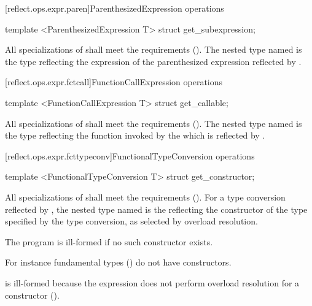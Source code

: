 [reflect.ops.expr.paren]{ParenthesizedExpression operations}
\begin{std.txt}\color{addclr}
\begin{itemdecl}
template <ParenthesizedExpression T> struct get_subexpression;
\end{itemdecl}
\begin{itemdescr}
\pnum
      All specializations of  shall meet the  requirements (). The nested type named  is the  type reflecting the expression  of the parenthesized expression  reflected by . 
\end{itemdescr}
\end{std.txt}

[reflect.ops.expr.fctcall]{FunctionCallExpression operations}
\begin{std.txt}\color{addclr}
\begin{itemdecl}
template <FunctionCallExpression T> struct get_callable;
\end{itemdecl}
\begin{itemdescr}
\pnum
      All specializations of  shall meet the  requirements (). The nested type named  is the  type reflecting the function invoked by the  which is reflected by .
\end{itemdescr}
\end{std.txt}


[reflect.ops.expr.fcttypeconv]{FunctionalTypeConversion operations}
\begin{std.txt}\color{addclr}
\begin{itemdecl}
template <FunctionalTypeConversion T> struct get_constructor;
\end{itemdecl}
\begin{itemdescr}
\pnum
			All specializations of  shall meet the  requirements (). For a type conversion reflected by , the nested type named  is the  reflecting the constructor of the type specified by the type conversion, as selected by overload resolution.

\pnum
\remarks
      The program is ill-formed if no such constructor exists.
      \begin{note} For instance fundamental types () do not have constructors. \end{note}
      \begin{note} 
      is ill-formed because the  expression does not perform overload resolution for a constructor ().
      \end{note}
\end{itemdescr}
\end{std.txt}

